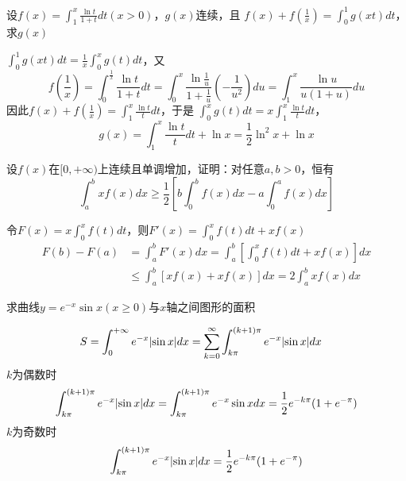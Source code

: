 \documentclass{article}
\begin{document}
\begin{examplle}[]
设\(\displaystyle f(x)=\int_1^x\frac{\ln t}{1+t}dt(x>0)\)，\(g(x)\)连续，且
\(f(x)+f(\frac{1}{x})=\int_0^1g(xt)dt\)，求\(g(x)\)

\(\int_0^1g(xt)dt=\frac{1}{x}\int_0^xg(t)dt\)，又
\begin{equation*}
f(\frac{1}{x})=\int_0^{\frac{1}{x}}\frac{\ln t}{1+t}dt=
\int_0^x\frac{\ln\frac{1}{u}}{1+\frac{1}{u}}(-\frac{1}{u^2})du=
\int_1^x\frac{\ln u}{u(1+u)}du
\end{equation*}
因此\(f(x)+f(\frac{1}{x})=\int_1^x\frac{\ln t}{t}dt\)，于是
\(\int_0^xg(t)dt=x\int_1^x\frac{\ln t}{t}dt\)，
\begin{equation*}
g(x)=\int_1^x\frac{\ln t}{t}dt+\ln x=\frac{1}{2}\ln^2x+\ln x
\end{equation*}
\end{examplle}

\begin{examplle}[]
设\(f(x)\)在\([0,+\infty)\)上连续且单调增加，证明：对任意\(a,b>0\)，恒有
\begin{equation*}
\int_a^bxf(x)dx\ge\frac{1}{2}\left[
b\int_0^bf(x)dx-a\int_0^af(x)dx
\right]
\end{equation*}

令\(F(x)=x\int_0^xf(t)dt\)，则\(F'(x)=\int_0^xf(t)dt+xf(x)\)
\begin{align*}
F(b)-F(a)&=\int_a^bF'(x)dx=\int_a^b
\left[\int_0^xf(t)dt+xf(x)
\right]dx\\
&\le\int_a^b[xf(x)+xf(x)]dx=2\int_a^bxf(x)dx
\end{align*}
\end{examplle}

\begin{examplle}[]
求曲线\(y=e^{-x}\sin x(x\ge0)\)与\(x\)轴之间图形的面积

\begin{align*}
S&=\int_0^{+\infty}e^{-x}\abs{\sin x}dx=
\sum_{k=0}^{\infty}\int_{k\pi}^{(k+1)\pi}e^{-x}\abs{\sin x}dx
\end{align*}
\(k\)为偶数时
\begin{equation*}
\int_{k\pi}^{(k+1)\pi}e^{-x}\abs{\sin x}dx=
\int_{k\pi}^{(k+1)\pi}e^{-x}\sin xdx=
\frac{1}{2}e^{-k\pi}(1+e^{-\pi})
\end{equation*}
\(k\)为奇数时
\begin{equation*}
\int_{k\pi}^{(k+1)\pi}e^{-x}\abs{\sin x}dx=\frac{1}{2}e^{-k\pi}(1+e^{-\pi})
\end{equation*}
\end{examplle}
\end{document}

